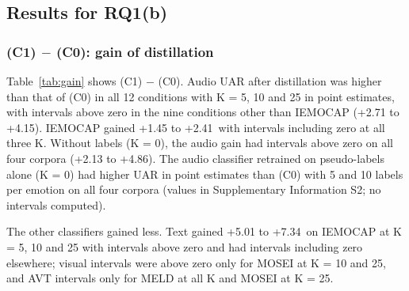 \subsection{Results for RQ1(b)}

\subsubsection{(C1) $-$ (C0): gain of distillation}\label{sec:rq1b-audio}
Table~\ref{tab:gain} shows (C1) $-$ (C0). Audio UAR after distillation was higher than that of (C0) in all 12 conditions with K = 5, 10 and 25 in point estimates, with intervals above zero in the nine conditions other than IEMOCAP (+2.71 to +4.15\pt). IEMOCAP gained +1.45 to +2.41\pt\ with intervals including zero at all three K. Without labels (K = 0), the audio gain had intervals above zero on all four corpora (+2.13 to +4.86\pt). The audio classifier retrained on pseudo-labels alone (K = 0) had higher UAR in point estimates than (C0) with 5 and 10 labels per emotion on all four corpora (values in Supplementary Information S2; no intervals computed).

The other classifiers gained less. Text gained +5.01 to +7.34\pt\ on IEMOCAP at K = 5, 10 and 25 with intervals above zero and had intervals including zero elsewhere; visual intervals were above zero only for MOSEI at K = 10 and 25, and AVT intervals only for MELD at all K and MOSEI at K = 25.

